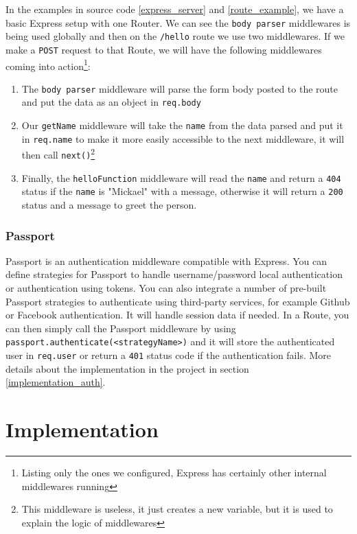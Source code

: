 \documentclass[twoside, openright,11pt,a4paper]{book}
\begin{document}
In the examples in source code \ref{express_server} and \ref{route_example}, we have a basic Express setup with one Router. We can see the \verb+body parser+ middlewares is being used globally and then on the \verb+/hello+ route we use two middlewares. If we make a \verb+POST+ request to that Route, we will have the following middlewares coming into action\footnote{Listing only the ones we configured, Express has certainly other internal middlewares running}:
\begin{enumerate}
	\item The \verb+body parser+ middleware will parse the form body posted to the route and put the data as an object in \verb+req.body+
	\item Our \verb+getName+ middleware will take the \verb+name+ from the data parsed and put it in \verb+req.name+ to make it more easily accessible to the next middleware, it will then call \verb+next()+\footnote{This middleware is useless, it just creates a new variable, but it is used to explain the logic of middlewares}
	\item Finally, the \verb+helloFunction+ middleware will read the \verb+name+ and return a \verb+404+\cite{mdn:status:404} status if the \verb+name+ is "Mickael" with a message, otherwise it will return a \verb+200+\cite{mdn:status:200} status and a message to greet the person.
\end{enumerate}

\subsection{Passport}
\label{passport}
Passport\cite{github:passport}\cite{passport:website} is an authentication middleware compatible with Express. You can define strategies for Passport to handle username/password local authentication or authentication using tokens. You can also integrate a number of pre-built Passport strategies to authenticate using third-party services, for example Github or Facebook authentication. It will handle session data if needed. In a Route, you can then simply call the Passport middleware by using \verb+passport.authenticate(<strategyName>)+ and it will store the authenticated user in \verb+req.user+ or return a \verb+401+\cite{mdn:status:401} status code if the authentication fails. More details about the implementation in the project in section \ref{implementation_auth}.

\chapter{Implementation}
\end{document}
